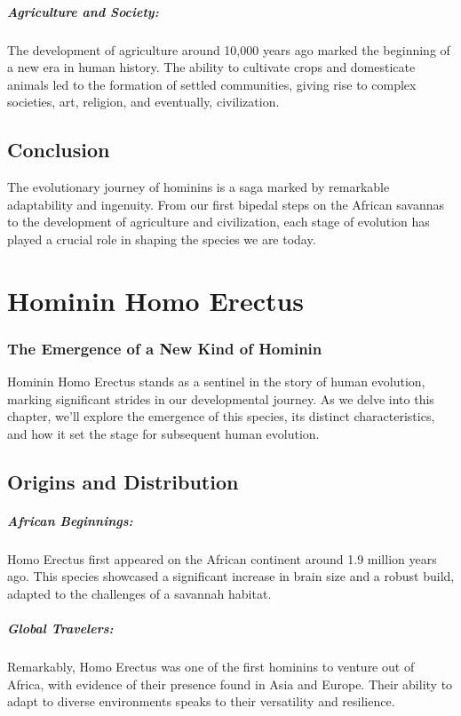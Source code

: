 \documentclass[a4paper,12pt]{book}
\begin{document}
\paragraph{Agriculture and Society:}
The development of agriculture around 10,000 years ago marked the beginning of a new era in human history. The ability to cultivate crops and domesticate animals led to the formation of settled communities, giving rise to complex societies, art, religion, and eventually, civilization.

\section*{Conclusion}

The evolutionary journey of hominins is a saga marked by remarkable adaptability and ingenuity. From our first bipedal steps on the African savannas to the development of agriculture and civilization, each stage of evolution has played a crucial role in shaping the species we are today.

\chapter{Hominin Homo Erectus}
\subsection*{The Emergence of a New Kind of Hominin}
Hominin Homo Erectus stands as a sentinel in the story of human evolution, marking significant strides in our developmental journey. As we delve into this chapter, we'll explore the emergence of this species, its distinct characteristics, and how it set the stage for subsequent human evolution.

\section*{Origins and Distribution}

\paragraph{African Beginnings:}
Homo Erectus first appeared on the African continent around 1.9 million years ago. This species showcased a significant increase in brain size and a robust build, adapted to the challenges of a savannah habitat.

\paragraph{Global Travelers:}
Remarkably, Homo Erectus was one of the first hominins to venture out of Africa, with evidence of their presence found in Asia and Europe. Their ability to adapt to diverse environments speaks to their versatility and resilience.
\end{document}
